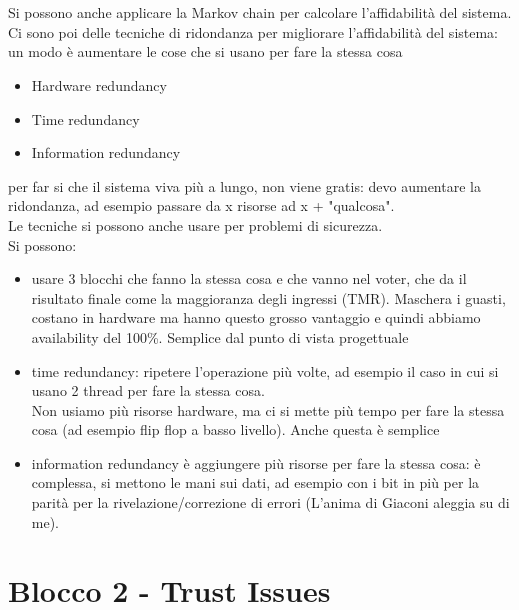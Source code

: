 \documentclass[oneside, 12pt]{extbook}
\begin{document}
\\\\Si possono anche applicare la Markov chain per calcolare l'affidabilità del sistema.
\\Ci sono poi delle tecniche di ridondanza per migliorare l'affidabilità del sistema: un modo è aumentare le cose che si usano per fare la stessa cosa
\begin{itemize}
	\item Hardware redundancy
	\item Time redundancy
	\item Information redundancy
\end{itemize}
per far si che il sistema viva più a lungo, non viene gratis: devo aumentare la ridondanza, ad esempio passare da x risorse ad x + "qualcosa".\\Le tecniche si possono anche usare per problemi di sicurezza.
\\Si possono:
\begin{itemize}
	\item usare 3 blocchi che fanno la stessa cosa e che vanno nel voter, che da il risultato finale come la maggioranza degli ingressi (TMR). Maschera i guasti, costano in hardware ma hanno questo grosso vantaggio e quindi abbiamo availability del 100\%. Semplice dal punto di vista progettuale
	\item time redundancy: ripetere l'operazione più volte, ad esempio il caso in cui si usano 2 thread per fare la stessa cosa.\\Non usiamo più risorse hardware, ma ci si mette più tempo per fare la stessa cosa (ad esempio flip flop a basso livello). Anche questa è semplice
	\item information redundancy è aggiungere più risorse per fare la stessa cosa: è complessa, si mettono le mani sui dati, ad esempio con i bit in più per la parità per la rivelazione/correzione di errori (L'anima di Giaconi aleggia su di me).
\end{itemize}


\chapter{Blocco 2 - Trust Issues}
\end{document}
